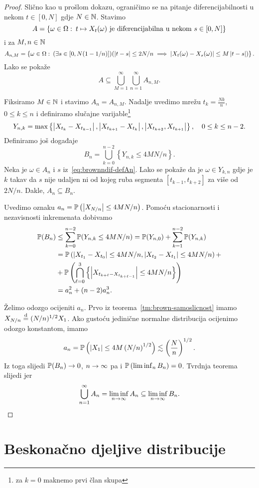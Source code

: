 \documentclass[main.tex]{subfiles}
\begin{document}
\begin{proof}
	Slično kao u prošlom dokazu, ograničimo se na pitanje diferencijabilnosti u nekom
	\( t \in \left[ 0, N \right] \) gdje \( N \in \N \). Stavimo
	\[ A = \left\{ \omega \in \Omega \st t \mapsto X_t(\omega)\mathrm{\ je \ diferencijabilna \ u\ nekom \  } s \in \left[ 0, N \right] \right\}  \]
	i za \( M, n \in \N \)
	\begin{equation} \label{eq:brownndif-defAn}
		A_{n, M} = \left\{ \omega \in \Omega \st (\exists s \in \left[ 0, N(1-1/n) \right])(\abs{t-s} \le 2N/n \implies \abs{X_t(\omega) - X_s(\omega)} \le M\abs{t-s}) \right\}.
	\end{equation}
	Lako se pokaže
	\[
		A \subseteq \bigcup_{M=1}^\infty \bigcup_{n=1}^\infty A_{n, M}.
	\]

	Fiksiramo \( M \in \N \) i stavimo \( A_n=A_{n,M} \). Nadalje uvedimo mrežu \( t_k = \frac{Nk}n \), \( 0\le k\le n \) i definiramo slučajne varijable\footnote{za \( k=0 \) maknemo prvi član skupa}
	\begin{equation}
		Y_{n, k} = \max \left\{ \abs{X_{t_k} - X_{t_{k-1}}}, \abs{X_{t_{k+1}}-X_{t_k}}, \abs{X_{t_{k+2}}, X_{t_{k+1}}}  \right\}, \quad 0 \le k \le n-2.
	\end{equation}
	Definiramo još događaje
	\begin{equation}
		B_n = \bigcup_{k=0}^{n-2} \left\{ Y_{n,k} \le 4MN/n \right\}.
	\end{equation}
	Neka je \( \omega \in A_n \) i \( s \) iz~\eqref{eq:brownndif-defAn}. Lako se pokaže da je \( \omega \in Y_{k, n} \) gdje je \( k \) takav da \( s \) nije udaljen ni od kojeg ruba segmenta
	\( \left[ t_{k-1}, t_{k+2} \right] \) za više od \( 2N/n \). Dakle, \( A_n \subseteq B_n \).

	Uvedimo oznaku \( a_n = \P\left(\abs{X_{N/n}} \le 4MN/n \right) \). Pomoću stacionarnosti i nezavisnosti inkremenata dobivamo
	\begin{align}
		\P(B_n) & \le \sum_{k=0}^{n-2} \P(Y_{n, k} \le 4MN/n) = \P(Y_{n, 0}) + \sum_{k=1}^{n-2} \P(Y_{n, k}) \\
		        & = \P\left(\abs{X_{t_1}-X_{t_0}} \le 4MN/n, \abs{X_{t_2} - X_{t_1}} \le 4MN/n\right) +      \\&+
		\P\left(\bigcap_{\ell=0}^3 \left\{ \abs{X_{t_{k+\ell} - X_{t_{k+\ell-1}}}} \le 4MN/n \right\} \right)
		\\ &= a_n^2 + (n-2)a_n^3.
	\end{align}

	Želimo odozgo ocijeniti \( a_n \). Prvo iz teorema~\ref{tm:brown-samoslicnost} imamo \( X_{N/n} \jpod (N/n)^{1/2} X_1 \). Ako gustoću jedinične normalne distribucija ocijenimo odozgo konstantom, imamo
	\[
		a_n = \P\left(\abs{X_1} \le 4M \left( N/n \right)  ^{1/2}\right) \lesssim \left( \frac Nn \right)^{1/2}.
	\]
	Iz toga slijedi \( \P(B_n) \un \), \( n \ub \) pa i \( \P\left( \liminf_n B_n \right) = 0 \). Tvrdnja teorema slijedi jer
	\[
		\bigcup_{n=1}^\infty A_n = \liminf_{n \ub} A_n \subseteq \liminf_{n \ub} B_n.
	\]
\end{proof}

\section{Beskonačno djeljive distribucije} \label{sec:sp-bdd}
\end{document}

